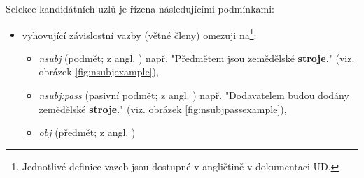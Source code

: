 \documentclass[thesis=M,czech]{FITthesis}[2019/12/23]
\begin{document}
\newpage
Selekce kandidátních uzlů je řízena následujícími podmínkami:
\begin{itemize}
    \item vyhovující závislostní vazby (větné členy) omezuji na\footnote{Jednotlivé definice vazeb jsou dostupné v angličtině v dokumentaci UD\cite{UDweb}.}:
    \begin{itemize}
        \item \textit{nsubj} (podmět; z angl. )\newline
        např. "Předmětem jsou zemědělské \textbf{stroje}."\newline
        (viz. obrázek \ref{fig:nsubjexample}),
        \item \textit{nsubj:pass} (pasivní podmět; z angl. )\newline
        např. "Dodavatelem budou dodány zemědělské \textbf{stroje}."\newline
        (viz. obrázek \ref{fig:nsubjpassexample}),
        \item \textit{obj} (předmět; z angl. )\newline

\end{itemize}
\end{itemize}
\end{document}
